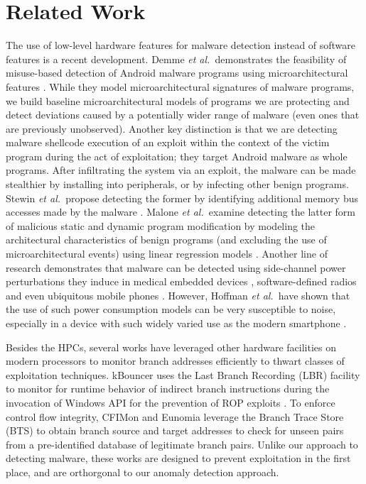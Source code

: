 \documentclass{acm_proc_article-sp}
\newcommand{\etal}[0]{{\it  et al.\ }}
\begin{document}
\section{Related Work}
\label{sec:related}

The use of low-level hardware features for malware detection instead
of software features is a recent development.  Demme \etal demonstrates
the feasibility of misuse-based detection of Android malware programs
using microarchitectural features \cite{Demme:2013:FOM:2485922.2485970}.
While they model microarchitectural signatures of malware programs,
we build baseline microarchitectural models of programs we are
protecting and detect deviations caused by a potentially wider range
of malware (even ones that are previously unobserved). Another key
distinction is that we are detecting malware shellcode execution
of an exploit within the context of the victim program during the
act of exploitation; they target Android malware as whole programs.
After infiltrating the system via an exploit, the malware can be
made stealthier by installing into peripherals, or by infecting
other benign programs. Stewin \etal propose detecting the former
by identifying additional memory bus accesses made by the malware
\cite{stewin2013primitive}. Malone \etal examine detecting the
latter form of malicious static and dynamic program modification
by modeling the architectural characteristics
of benign programs (and excluding the use of microarchitectural events) using linear regression models
\cite{Malone:2011:HPC:2046582.2046596}. Another line of research
demonstrates that malware can be detected using side-channel power
perturbations they induce in medical embedded devices
\cite{clarkwattsupdoc}, software-defined radios
\cite{gonzalez2010detecting} and even ubiquitous mobile phones
\cite{kim2008detecting}. However, Hoffman \etal have shown that the
use of such power consumption models can be very susceptible to
noise, especially in a device with such widely varied use as the
modern smartphone \cite{hoffmann2013mobile}.

Besides the HPCs, several works have leveraged other hardware facilities on modern processors to monitor branch addresses efficiently to thwart classes of exploitation techniques. kBouncer uses the Last Branch Recording (LBR) facility to monitor for runtime behavior of indirect branch instructions during the invocation of Windows API for the prevention of ROP exploits \cite{pappastransparent}. To enforce control flow integrity, CFIMon \cite{YubinXia:2012:CDV:2354410.2355130} and Eunomia \cite{DBLP:conf/apsys/YuanXCZ11} leverage the Branch Trace Store (BTS) to obtain branch source and target addresses to check for unseen pairs from a pre-identified database of legitimate branch pairs. Unlike our approach to detecting malware, these works are designed to prevent exploitation in the first place, and are orthorgonal to our anomaly detection approach. 
\end{document}

